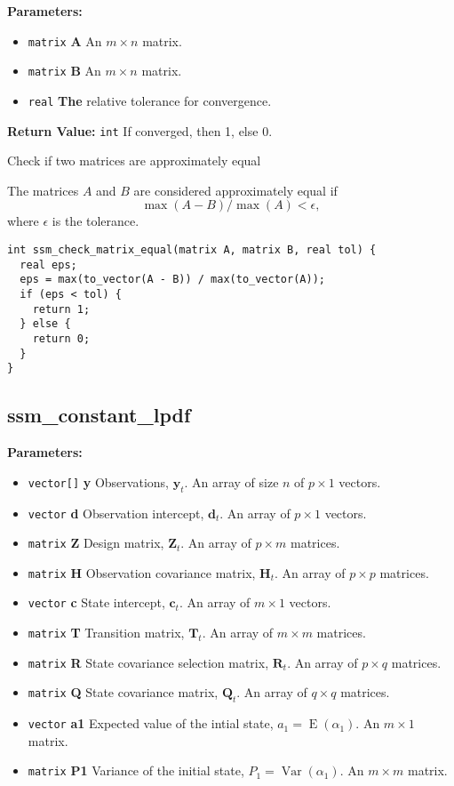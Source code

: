 \documentclass[]{book}
\providecommand{\tightlist}{%
  \setlength{\itemsep}{0pt}\setlength{\parskip}{0pt}}
\DeclareMathOperator{\E}{E}
\DeclareMathOperator{\Var}{Var}
\newcommand{\mat}[1]{\boldsymbol{#1}}
\renewcommand{\vec}[1]{\boldsymbol{#1}}
\begin{document}
\textbf{Parameters:}

\begin{itemize}
\tightlist
\item
  \texttt{matrix} \textbf{A} An \(m \times n\) matrix.
\item
  \texttt{matrix} \textbf{B} An \(m \times n\) matrix.
\item
  \texttt{real} \textbf{The} relative tolerance for convergence.
\end{itemize}

\textbf{Return Value:} \texttt{int} If converged, then 1, else 0.

Check if two matrices are approximately equal

The matrices \(A\) and \(B\) are considered approximately equal if \[
\max(A - B) / \max(A) < \epsilon,
\] where \(\epsilon\) is the tolerance.

\begin{verbatim}
int ssm_check_matrix_equal(matrix A, matrix B, real tol) {
  real eps;
  eps = max(to_vector(A - B)) / max(to_vector(A));
  if (eps < tol) {
    return 1;
  } else {
    return 0;
  }
}
\end{verbatim}

\subsection{ssm\_constant\_lpdf}\label{ssmux5fconstantux5flpdf}

\textbf{Parameters:}

\begin{itemize}
\tightlist
\item
  \texttt{vector{[}{]}} \textbf{y} Observations, \(\vec{y}_t\). An array
  of size \(n\) of \(p \times 1\) vectors.
\item
  \texttt{vector} \textbf{d} Observation intercept, \(\vec{d}_t\). An
  array of \(p \times 1\) vectors.
\item
  \texttt{matrix} \textbf{Z} Design matrix, \(\mat{Z}_t\). An array of
  \(p \times m\) matrices.
\item
  \texttt{matrix} \textbf{H} Observation covariance matrix,
  \(\mat{H}_t\). An array of \(p \times p\) matrices.
\item
  \texttt{vector} \textbf{c} State intercept, \(\vec{c}_t\). An array of
  \(m \times 1\) vectors.
\item
  \texttt{matrix} \textbf{T} Transition matrix, \(\mat{T}_t\). An array
  of \(m \times m\) matrices.
\item
  \texttt{matrix} \textbf{R} State covariance selection matrix,
  \(\mat{R} _t\). An array of \(p \times q\) matrices.
\item
  \texttt{matrix} \textbf{Q} State covariance matrix, \(\mat{Q}_t\). An
  array of \(q \times q\) matrices.
\item
  \texttt{vector} \textbf{a1} Expected value of the intial state,
  \(a_1 = \E(\alpha_1)\). An \(m \times 1\) matrix.
\item
  \texttt{matrix} \textbf{P1} Variance of the initial state,
  \(P_1 = \Var(\alpha_1)\). An \(m \times m\) matrix.
\end{itemize}
\end{document}

